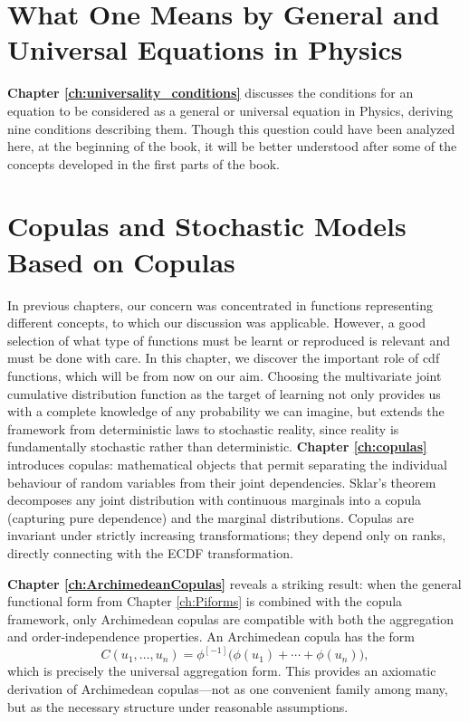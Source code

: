 \section{What One Means by General and Universal Equations in Physics}
\textbf{Chapter \ref{ch:universality_conditions}}
discusses the conditions for an equation to be considered as a general or universal equation in Physics, deriving nine conditions describing them. Though this question could have been analyzed here, at the beginning of the book, it will be better understood after some of the concepts developed in the first parts of the book.

\section{Copulas and Stochastic Models Based on Copulas}
In previous chapters, our concern was concentrated in functions representing different concepts, to which our discussion was applicable. However, a good selection of what type of functions must be learnt or reproduced is relevant and must be done with care. In this chapter, we discover the important role of cdf functions, which will be from now on our aim.
Choosing the multivariate joint cumulative distribution function as the target of learning not only provides us with a complete knowledge of any probability we can imagine, but extends the framework from deterministic laws to stochastic reality, since reality is fundamentally stochastic rather than deterministic. \textbf{Chapter \ref{ch:copulas}} introduces copulas: mathematical objects that permit separating the individual behaviour of random variables from their joint dependencies. Sklar's theorem decomposes any joint distribution with continuous marginals into a copula (capturing pure dependence) and the marginal distributions. Copulas are invariant under strictly increasing transformations; they depend only on ranks, directly connecting with the ECDF transformation.

\textbf{Chapter \ref{ch:ArchimedeanCopulas}} reveals a striking result: when the general functional form from Chapter \ref{ch:Piforms} is combined with the copula framework, only Archimedean copulas are compatible with both the aggregation and order‑independence properties. An Archimedean copula has the form
\[
C(u_1,\ldots,u_n) = \phi^{[-1]}\bigl(\phi(u_1)+\cdots+\phi(u_n)\bigr),
\]
which is precisely the universal aggregation form. This provides an axiomatic derivation of Archimedean copulas—not as one convenient family among many, but as the necessary structure under reasonable assumptions.

